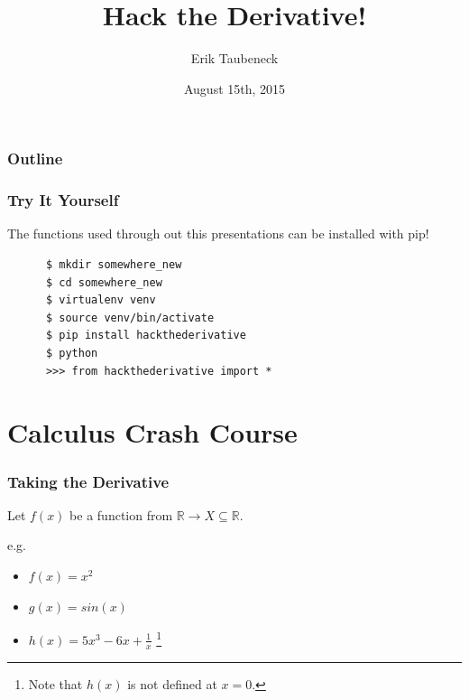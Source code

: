 \documentclass{beamer}
\title{
{\bf{\textsf{Hack the Derivative!}}}}
\author[Erik Taubeneck]{Erik Taubeneck}
\institute{
  GameChanger Media - Software Engineer

  We're hiring! \url{https://gc.com/about/careers}
}
\date{August 15th, 2015}
\def\R{\mathbb{R}}                     %
\begin{document}


\begin{frame}
  \titlepage
\end{frame}


\begin{frame}
\frametitle{Outline}
\tableofcontents
\end{frame}

\begin{frame}[fragile]

  \frametitle{Try It Yourself}

  The functions used through out this presentations can be installed with pip!

  \begin{lstlisting}
      $ mkdir somewhere_new
      $ cd somewhere_new
      $ virtualenv venv
      $ source venv/bin/activate
      $ pip install hackthederivative
      $ python
      >>> from hackthederivative import *
  \end{lstlisting}

\end{frame}


\section{Calculus Crash Course}

\begin{frame}

  \frametitle{Taking the Derivative}

  Let $f(x)$ be a function from $\R \to X \subseteq \R$.

  e.g.
  \begin{itemize}
    \item $f(x) = x^2$
    \item $g(x) = sin(x)$
    \item $h(x) = 5x^3 - 6x + \frac{1}{x}$ \footnote{Note that $h(x)$ is not defined at $x=0$.}
  \end{itemize}



\end{frame}
\end{document}
